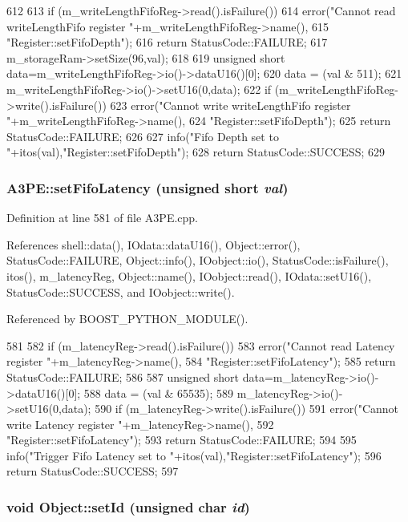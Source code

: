 \begin{DoxyCode}
612                                              {
613   if (m_writeLengthFifoReg->read().isFailure()){
614     error("Cannot read writeLengthFifo register "+m_writeLengthFifoReg->name(),
615         "Register::setFifoDepth");
616     return StatusCode::FAILURE;
617     m_storageRam->setSize(96,val);
618   }
619   unsigned short data=m_writeLengthFifoReg->io()->dataU16()[0];
620   data = (val & 511);   
621   m_writeLengthFifoReg->io()->setU16(0,data);
622   if (m_writeLengthFifoReg->write().isFailure()){
623     error("Cannot write writeLengthFifo register "+m_writeLengthFifoReg->name(),
624         "Register::setFifoDepth");
625     return StatusCode::FAILURE;
626   }
627   info("Fifo Depth set to "+itos(val),"Register::setFifoDepth");
628   return StatusCode::SUCCESS;
629 }
\end{DoxyCode}
\hypertarget{classA3PE_a969469569005dfb130aca674de5dacff}{
\subsubsection[{setFifoLatency}]{ A3PE::setFifoLatency (unsigned short {\em val})}}
\label{classA3PE_a969469569005dfb130aca674de5dacff}


Definition at line 581 of file A3PE.cpp.

References shell::data(), IOdata::dataU16(), Object::error(), StatusCode::FAILURE, Object::info(), IOobject::io(), StatusCode::isFailure(), itos(), m\_\-latencyReg, Object::name(), IOobject::read(), IOdata::setU16(), StatusCode::SUCCESS, and IOobject::write().

Referenced by BOOST\_\-PYTHON\_\-MODULE().


\begin{DoxyCode}
581                                                  {
582   if (m_latencyReg->read().isFailure()){
583     error("Cannot read Latency register "+m_latencyReg->name(),
584         "Register::setFifoLatency");
585     return StatusCode::FAILURE;
586   }
587   unsigned short data=m_latencyReg->io()->dataU16()[0];
588   data = (val & 65535);   
589   m_latencyReg->io()->setU16(0,data);
590   if (m_latencyReg->write().isFailure()){
591     error("Cannot write Latency register "+m_latencyReg->name(),
592         "Register::setFifoLatency");
593     return StatusCode::FAILURE;
594   }
595   info("Trigger Fifo Latency set to "+itos(val),"Register::setFifoLatency");
596   return StatusCode::SUCCESS;
597 }
\end{DoxyCode}
\hypertarget{classObject_a398fe08cba594a0ce6891d59fe4f159f}{
\subsubsection[{setId}]{\setlength{\rightskip}{0pt plus 5cm}void Object::setId (unsigned char {\em id})}}
\label{classObject_a398fe08cba594a0ce6891d59fe4f159f}


